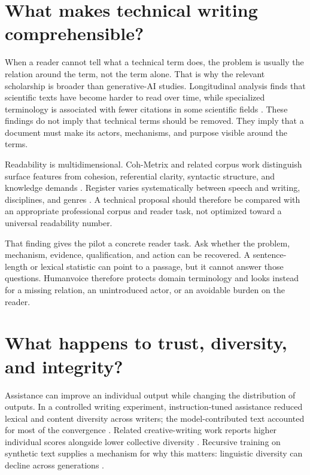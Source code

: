 \section{What makes technical writing comprehensible?}

When a reader cannot tell what a technical term does, the problem is usually
the relation around the term, not the term alone. That is why the relevant
scholarship is broader than generative-AI studies. Longitudinal analysis finds
that scientific texts have become harder to read over time, while specialized
terminology is associated with fewer citations in some scientific fields
\citep{plavensigray2017readability,martinez2021terminology}. These findings do
not imply that technical terms should be removed. They imply that a document
must make its actors, mechanisms, and purpose visible around the terms.

Readability is multidimensional. Coh-Metrix and related corpus work distinguish
surface features from cohesion, referential clarity, syntactic structure, and
knowledge demands \citep{graesser2004cohmetrix,crossley2022clear}. Register
varies systematically between speech and writing, disciplines, and genres
\citep{biber1988variation}. A technical proposal should therefore be compared
with an appropriate professional corpus and reader task, not optimized toward
a universal readability number.

That finding gives the pilot a concrete reader task. Ask whether the problem,
mechanism, evidence, qualification, and action can be recovered. A
sentence-length or lexical statistic can point to a passage, but it cannot
answer those questions. Humanvoice therefore protects domain terminology and
looks instead for a missing relation, an unintroduced actor, or an avoidable
burden on the reader.

\section{What happens to trust, diversity, and integrity?}

Assistance can improve an individual output while changing the distribution of
outputs. In a controlled writing experiment, instruction-tuned assistance
reduced lexical and content diversity across writers; the model-contributed
text accounted for most of the convergence \citep{padmakumar2024writing}.
Related creative-writing work reports higher individual scores alongside lower
collective diversity \citep{doshi2024generative}. Recursive training on
synthetic text supplies a mechanism for why this matters: linguistic diversity
can decline across generations \citep{guo2023curious}.

